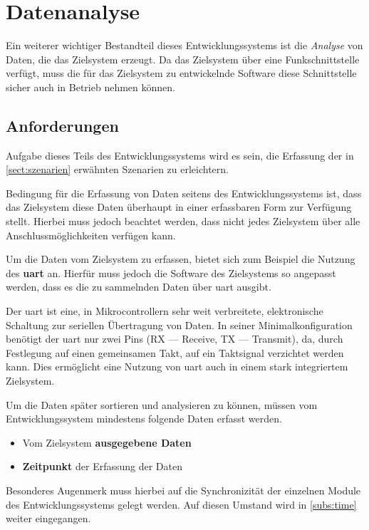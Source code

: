 \section{Datenanalyse}\label{sec:datenan}
Ein weiterer wichtiger Bestandteil dieses Entwicklungssystems ist die
\emph{Analyse} von Daten, die das Zielsystem erzeugt. Da das Zielsystem über
eine Funkschnittstelle verfügt, muss die für das Zielsystem zu entwickelnde
Software diese Schnittstelle sicher auch in Betrieb nehmen können.
\subsection{Anforderungen}
Aufgabe dieses Teils des Entwicklungssystems wird es sein, die Erfassung der in
\autoref{sect:szenarien} erwähnten Szenarien zu erleichtern.

Bedingung für die Erfassung von Daten seitens des Entwicklungssystems ist, dass
das Zielsystem diese Daten überhaupt in einer erfassbaren Form zur Verfügung
stellt. Hierbei muss jedoch beachtet werden, dass nicht jedes Zielsystem über
alle Anschlussmöglichkeiten verfügen kann.

Um die Daten vom Zielsystem zu erfassen, bietet sich zum Beispiel die Nutzung
des \textbf{\gls{uart}} an. Hierfür muss jedoch die Software des Zielsystems so
angepasst werden, dass es die zu sammelnden Daten über \gls{uart} ausgibt.

\begin{definition}[UART]
Der \gls{uart} ist eine, in Mikrocontrollern sehr weit
verbreitete, elektronische Schaltung zur seriellen Übertragung von Daten. In
seiner Minimalkonfiguration benötigt der \gls{uart} nur zwei Pins (RX ---
Receive, TX --- Transmit), da, durch Festlegung auf einen gemeinsamen Takt, auf
ein Taktsignal verzichtet werden kann. Dies ermöglicht eine Nutzung von
\gls{uart} auch in einem stark integriertem Zielsystem.
\end{definition}

Um die Daten später sortieren und analysieren zu können, müssen vom
Entwicklungssystem mindestens folgende Daten erfasst werden.
\begin{itemize}
  \item Vom Zielsystem \textbf{ausgegebene Daten}
  \item \textbf{Zeitpunkt} der Erfassung der Daten
\end{itemize}

Besonderes Augenmerk muss hierbei auf die Synchronizität der einzelnen Module
des Entwicklungssystems gelegt werden. Auf diesen Umstand wird in
\autoref{subs:time} weiter eingegangen. 

